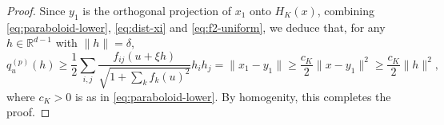 \documentclass[10pt,a4paper]{amsart}
\newcommand{\IR}{\mathbb{R}}
\begin{document}
\begin{proof}
Since $y_1$ is the orthogonal projection of $x_1$ onto $H_K(x)$, combining \eqref{eq:paraboloid-lower}, \eqref{eq:dist-xi} and \eqref{eq:f2-uniform}, we deduce that, for any $h\in \IR^{d-1}$ with $\|h\|=\delta$,
\[
q^{(p)}_u(h)
\ge \frac{1}{2}\sum_{i,j}\frac{f_{ij}(u+\xi h)}{\sqrt{1+\sum_k f_k(u)^2}}h_i h_j
= \|x_1-y_1\|
\ge \frac{c_K}{2} \|x-y_1\|^2 
\ge \frac{c_K}{2} \|h\|^2,
\]
where $c_K>0$ is as in \eqref{eq:paraboloid-lower}. By homogenity, this completes the proof.
\end{proof}
\end{document}
